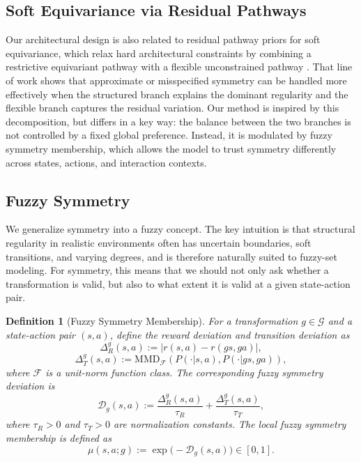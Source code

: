 \documentclass[lettersize,journal]{IEEEtran}
\newtheorem{definition}{Definition}
\newcommand{\Acal}{\mathcal}
\begin{document}
\subsection{Soft Equivariance via Residual Pathways}
Our architectural design is also related to residual pathway priors for soft equivariance, which relax hard architectural constraints by combining a restrictive equivariant pathway with a flexible unconstrained pathway \cite{finzi2021rpp}. That line of work shows that approximate or misspecified symmetry can be handled more effectively when the structured branch explains the dominant regularity and the flexible branch captures the residual variation. Our method is inspired by this decomposition, but differs in a key way: the balance between the two branches is not controlled by a fixed global preference. Instead, it is modulated by fuzzy symmetry membership, which allows the model to trust symmetry differently across states, actions, and interaction contexts.

\subsection{Fuzzy Symmetry}
We generalize symmetry into a fuzzy concept. The key intuition is that structural regularity in realistic environments often has uncertain boundaries, soft transitions, and varying degrees, and is therefore naturally suited to fuzzy-set modeling. For symmetry, this means that we should not only ask whether a transformation is valid, but also to what extent it is valid at a given state-action pair.

\begin{definition}[Fuzzy Symmetry Membership]
For a transformation $g\in\Acal{G}$ and a state-action pair $(s,a)$, define the reward deviation and transition deviation as
\begin{equation}
\Delta_R^g(s,a) := |r(s,a)-r(gs,ga)|,
\end{equation}
\begin{equation}
\Delta_T^g(s,a) := \mathrm{MMD}_{\mathcal F}\!\left(P(\cdot|s,a), P(\cdot|gs,ga)\right),
\end{equation}
where $\mathcal F$ is a unit-norm function class. The corresponding fuzzy symmetry deviation is
\begin{equation}
\mathcal D_g(s,a)
:=
\frac{\Delta_R^g(s,a)}{\tau_R}
+
\frac{\Delta_T^g(s,a)}{\tau_T},
\label{eq:fuzzy-deviation}
\end{equation}
where $\tau_R>0$ and $\tau_T>0$ are normalization constants. The local fuzzy symmetry membership is defined as
\begin{equation}
\mu(s,a;g)
:=
\exp\!\big(-\mathcal D_g(s,a)\big)\in[0,1].
\label{eq:fuzzy-membership}
\end{equation}
\end{definition}
\end{document}
